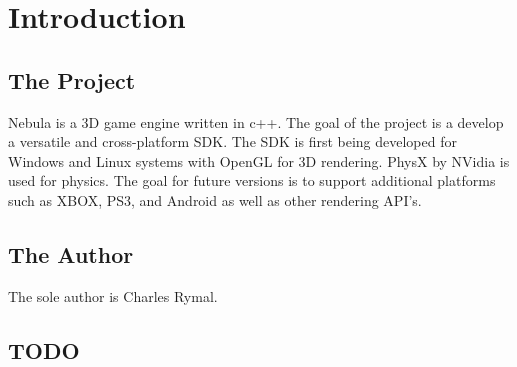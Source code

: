 \hypertarget{index_intro}{}\section{Introduction}\label{index_intro}
\hypertarget{index_proj}{}\subsection{The Project}\label{index_proj}
Nebula is a 3D game engine written in c++. The goal of the project is a develop a versatile and cross-\/platform SDK. The SDK is first being developed for Windows and Linux systems with OpenGL for 3D rendering. PhysX by NVidia is used for physics. The goal for future versions is to support additional platforms such as XBOX, PS3, and Android as well as other rendering API's.\hypertarget{index_author}{}\subsection{The Author}\label{index_author}
The sole author is Charles Rymal.\hypertarget{index_TODO}{}\subsection{TODO}\label{index_TODO}

